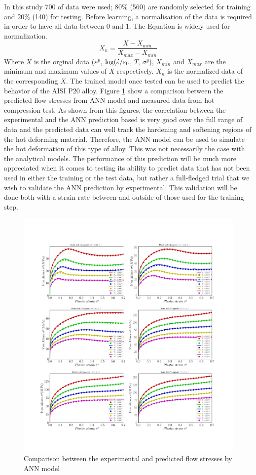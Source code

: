 \documentclass[twoside,english,1p,final,sort&compress]{elsarticle}
\theoremstyle{plain}
\newcommand{\mdot}[1]{\accentset{\mbox{\bfseries .}}{#1}}
\begin{document}
In this study $700$ of data were used; $80\%$ (560) are randomly selected for training and $20\%$ (140) for testing. Before learning, a normalisation of the data is required in order to have all data between $0$ and $1$. The Equation is widely used for normalization.
\begin{equation}
X_n = \frac{X - X_{min}}{X_{max} - X_{min}}
\end{equation}
Where $X$ is the orginal data ($\varepsilon^p$, $\log(\mdot\varepsilon/\varepsilon_0$,  $T$, $\sigma^y$), $X_{min}$ and $X_{max}$ are the minimum and maximum values of $X$ respectively. $X_n$ is the normalized data of the corresponding $X$. The trained model once tested can be used to predict the behavior of the AISI P20 alloy. Figure \ref{fig:iCorrelationANN} show a comparison between the predicted ﬂow stresses from ANN model and measured data from hot compression test. As shown from this figures, the correlation between the experimental and the ANN prediction based is very good over the full range of data and the predicted data can well track the hardening and softening regions of the hot deforming material. Therefore, the ANN model can be used to simulate the hot deformation of this type of alloy. This was not necessarily the case with the analytical models. The performance of this prediction will be much more appreciated when it comes to testing its ability to predict data that has not been used in either the training or the test data, but rather a full-fledged trial that we wish to validate the ANN prediction by experimental. This validation will be done both with a strain rate between and outside of those used for the training step.
\begin{figure}[!ht]
\centering
\includegraphics[width=1\columnwidth]
{Figures/CompExpANN}
\caption{Comparison between the experimental and predicted flow stresses by ANN model }
\label{fig:iCorrelationANN}
\end{figure}
\end{document}
